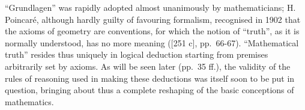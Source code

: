 ``Grundlagen'' was rapidly adopted almost unanimously by mathematicians; H. Poincaré, although hardly guilty of favouring formalism, recognised in 1902 that the axioms of geometry are conventions, for which the notion of ``truth'', as it is normally understood, has no more meaning ({[}251 c{]}, pp.~66-67). ``Mathematical truth'' resides thus uniquely in logical deduction starting from premises arbitrarily set by axioms. As will be seen later (pp.~35 ff.), the validity of the rules of reasoning used in making these deductions was itself soon to be put in question, bringing about thus a complete reshaping of the basic conceptions of mathematics.

